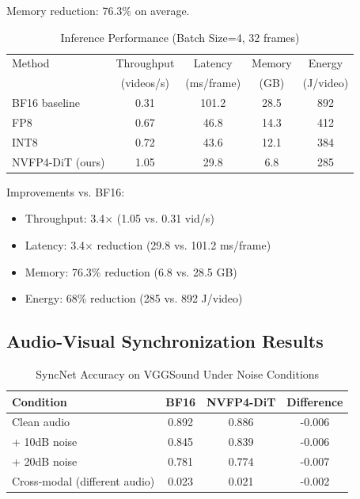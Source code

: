 \documentclass[journal,twoside]{IEEEtran}
\theoremstyle{definition}
\theoremstyle{remark}
\begin{document}
Memory reduction: 76.3\% on average.

\begin{table}[H]
\centering
\caption{Inference Performance (Batch Size=4, 32 frames)}
\label{tab:inference}
\begin{tabular}{lcccc}
\toprule
Method & Throughput & Latency & Memory & Energy \\
& (videos/s) & (ms/frame) & (GB) & (J/video) \\
\midrule
BF16 baseline & 0.31 & 101.2 & 28.5 & 892 \\
FP8 & 0.67 & 46.8 & 14.3 & 412 \\
INT8 & 0.72 & 43.6 & 12.1 & 384 \\
NVFP4-DiT (ours) & 1.05 & 29.8 & 6.8 & 285 \\
\bottomrule
\end{tabular}
\end{table}

Improvements vs. BF16:
\begin{itemize}
    \item Throughput: 3.4$\times$ (1.05 vs. 0.31 vid/s)
    \item Latency: 3.4$\times$ reduction (29.8 vs. 101.2 ms/frame)
    \item Memory: 76.3\% reduction (6.8 vs. 28.5 GB)
    \item Energy: 68\% reduction (285 vs. 892 J/video)
\end{itemize}

\FloatBarrier
\subsection{Audio-Visual Synchronization Results}

\begin{table}[H]
\centering
\caption{SyncNet Accuracy on VGGSound Under Noise Conditions}
\label{tab:syncnet}
\begin{tabular}{lccc}
\toprule
Condition & BF16 & NVFP4-DiT & Difference \\
\midrule
Clean audio & 0.892 & 0.886 & -0.006 \\
+ 10dB noise & 0.845 & 0.839 & -0.006 \\
+ 20dB noise & 0.781 & 0.774 & -0.007 \\
Cross-modal (different audio) & 0.023 & 0.021 & -0.002 \\
\bottomrule
\end{tabular}
\end{table}
\end{document}
